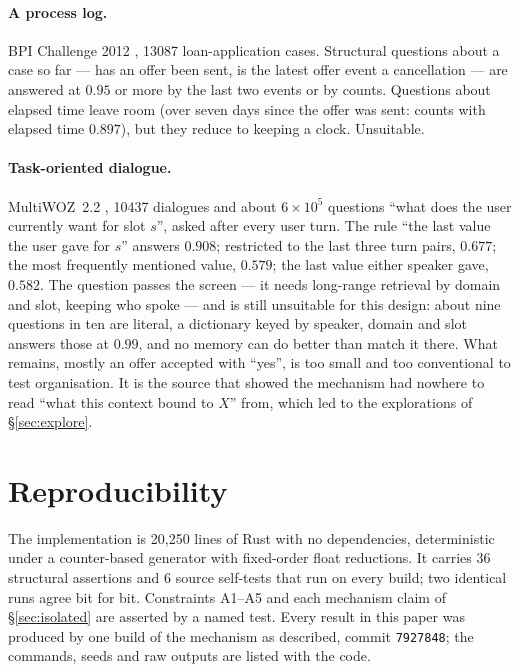 \documentclass[11pt,a4paper]{article}
\theoremstyle{plain}
\theoremstyle{definition}
\theoremstyle{remark}
\begin{document}
\paragraph{A process log.} BPI Challenge 2012 \citep{vandongen2012bpi}, 13087
loan-application cases. Structural questions about a case so far --- has an
offer been sent, is the latest offer event a cancellation --- are answered at
$0.95$ or more by the last two events or by counts. Questions about elapsed
time leave room (over seven days since the offer was sent: counts with elapsed
time $0.897$), but they reduce to keeping a clock. Unsuitable.

\paragraph{Task-oriented dialogue.} MultiWOZ~2.2
\citep{budzianowski2018multiwoz,zang2020multiwoz}, 10437 dialogues and about
$6\times10^5$ questions ``what does the user currently want for slot $s$'',
asked after every user turn. The rule ``the last value the user gave for $s$''
answers $0.908$; restricted to the last three turn pairs, $0.677$; the most
frequently mentioned value, $0.579$; the last value either speaker gave,
$0.582$. The question passes the screen --- it needs long-range retrieval by
domain and slot, keeping who spoke --- and is still unsuitable for this design:
about nine questions in ten are literal, a dictionary keyed by speaker, domain
and slot answers those at $0.99$, and no memory can do better than match it
there. What remains, mostly an offer accepted with ``yes'', is too small and
too conventional to test organisation. It is the source that showed the
mechanism had nowhere to read ``what this context bound to $X$'' from, which led
to the explorations of \S\ref{sec:explore}.

\section{Reproducibility}
\label{app:repro}

The implementation is 20{,}250 lines of Rust with no dependencies,
deterministic under a counter-based generator with fixed-order float
reductions. It carries $36$ structural assertions and $6$ source self-tests
that run on every build; two identical runs agree bit for bit. Constraints
A1--A5 and each mechanism claim of \S\ref{sec:isolated} are asserted by a named
test. Every result in this paper was produced by one build of the mechanism as
described, commit \texttt{7927848}; the commands, seeds and raw outputs are listed
with the code.
\end{document}
